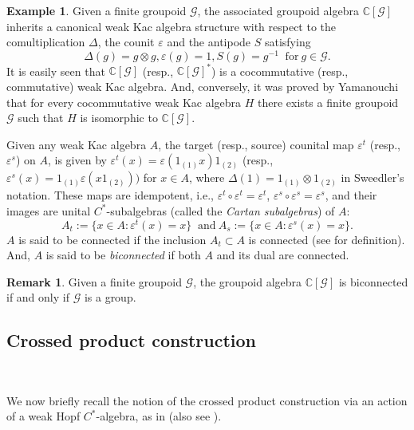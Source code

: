 \documentclass{amsart}
\theoremstyle{definition}
\newtheorem{example}[theorem]{Example}
\theoremstyle{theorem}
\newtheorem{remark}[theorem]{Remark}
\newcommand{\C}{\mathbb{C}}
\newcommand{\ot}{\otimes}
\newcommand{\mg}{\mathcal{G}}
\begin{document}
\begin{example} Given a finite groupoid $\mg$, 
the associated {groupoid algebra} $\C[\mg]$ inherits a canonical weak
Kac algebra structure with respect to the comultiplication $\Delta$,
the counit $\varepsilon$ and the antipode $S$ satisfying
\[
\Delta(g) = g \ot g, \varepsilon(g) = 1, S(g) = g^{-1}\ \text{ for}\  g \in \mg.
\] 
It is easily seen that $\C[\mg]$ (resp., $\C[\mg]^*$) is a
cocommutative (resp., commutative) weak Kac algebra. And, conversely,
it was proved by Yamanouchi that for every cocommutative weak Kac
algebra $H$ there exists a finite groupoid $\mg$ such that $H$ is
isomorphic to $\C[\mg]$.
\end{example}


 Given any weak Kac algebra $A$, the target (resp., source) counital
 map $\varepsilon^t$ (resp., $\varepsilon^s$) on $A$, is given by
 $\varepsilon^t(x)=\varepsilon(1_{(1)}x)1_{(2)}$ \big(resp.,
 $\varepsilon^s(x)=1_{(1)}\varepsilon(x1_{(2)})\big)$ for $x\in A$,
 where $\Delta(1) = 1_{(1)}\ot 1_{(2)}$ in Sweedler's notation.  These
 maps are idempotent, i.e., $\varepsilon^t \circ \varepsilon^t =
 \varepsilon^t$, $\varepsilon^s \circ \varepsilon^s = \varepsilon^s$,
 and their images are unital $C^*$-subalgebras (called the {\it
   Cartan subalgebras}) of $A$:
\[
 A_t:=\{x\in A: \varepsilon^t(x)=x\}\ \text{ and} \
 A_s:=\{x\in A: \varepsilon^s(x)=x\}.
 \]
$A$ is said to be connected if the
  inclusion $A_t\subset A$ is connected (see \cite{GHJ} for
  definition). And, $A$ is said to be \textit{biconnected} if both $A$
  and its dual are connected. 


  \begin{remark}

 Given a finite groupoid $\mg$, the  groupoid algebra $\C[\mg]$ is biconnected if
  and only if $\mg$ is a group. 
    \end{remark}
\color{black}


\color{black}
\subsection{Crossed product construction}\( \)


We now briefly recall the notion of the crossed product construction via an action of 
a weak Hopf $C^*$-algebra, as in \cite{NSW} (also see \cite{NV2, NV1}).
\end{document}
